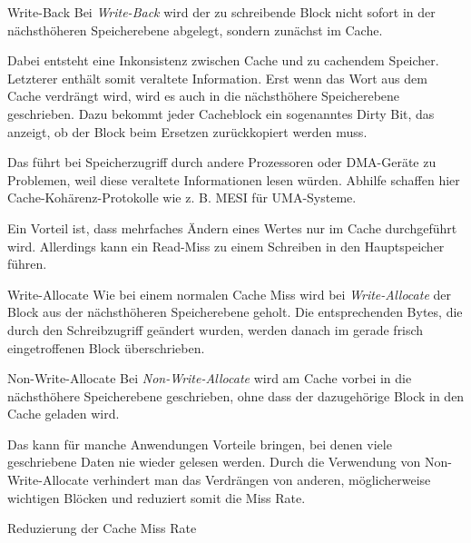 \begin{defi}[Schreibstrategie]{Write-Back}
    Bei \emph{Write-Back} wird der zu schreibende Block nicht sofort in der nächsthöheren Speicherebene abgelegt, sondern zunächst im Cache.

    Dabei entsteht eine Inkonsistenz zwischen Cache und zu cachendem Speicher.
    Letzterer enthält somit veraltete Information.
    Erst wenn das Wort aus dem Cache verdrängt wird, wird es auch in die nächsthöhere Speicherebene geschrieben.
    Dazu bekommt jeder Cacheblock ein sogenanntes Dirty Bit, das anzeigt, ob der Block beim Ersetzen zurückkopiert werden muss.

    Das führt bei Speicherzugriff durch andere Prozessoren oder DMA-Geräte zu Problemen, weil diese veraltete Informationen lesen würden.
    Abhilfe schaffen hier Cache-Kohärenz-Protokolle wie z. B. MESI für UMA-Systeme.

    Ein Vorteil ist, dass mehrfaches Ändern eines Wertes nur im Cache durchgeführt wird.
    Allerdings kann ein Read-Miss zu einem Schreiben in den Hauptspeicher führen.
\end{defi}

\begin{bonus}[Schreibstrategie]{Write-Allocate}
    Wie bei einem normalen Cache Miss wird bei \emph{Write-Allocate} der Block aus der nächsthöheren Speicherebene geholt.
    Die entsprechenden Bytes, die durch den Schreibzugriff geändert wurden, werden danach im gerade frisch eingetroffenen Block überschrieben.
\end{bonus}

\begin{bonus}[Schreibstrategie]{Non-Write-Allocate}
    Bei \emph{Non-Write-Allocate} wird am Cache vorbei in die nächsthöhere Speicherebene geschrieben, ohne dass der dazugehörige Block in den Cache geladen wird.

    Das kann für manche Anwendungen Vorteile bringen, bei denen viele geschriebene Daten nie wieder gelesen werden.
    Durch die Verwendung von Non-Write-Allocate verhindert man das Verdrängen von anderen, möglicherweise wichtigen Blöcken und reduziert somit die Miss Rate.
\end{bonus}

\begin{defi}{Reduzierung der Cache Miss Rate}

\end{defi}

